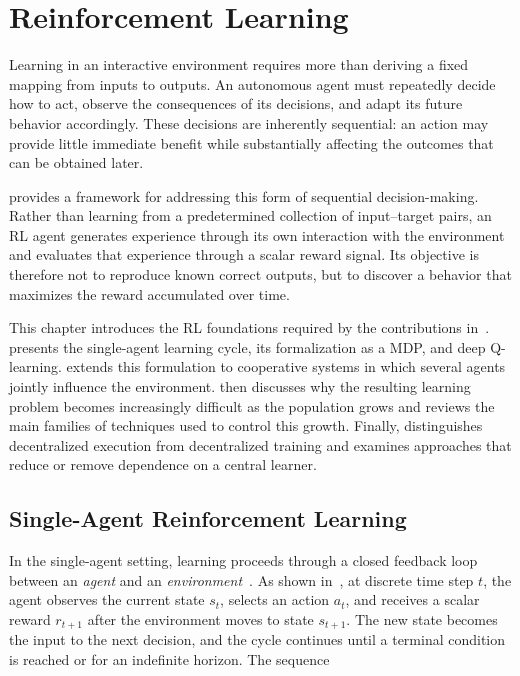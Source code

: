 \chapter{Reinforcement Learning}
\label{chap:reinforcement-learning}
\minitoc

Learning in an interactive environment requires more than 
 deriving a fixed mapping from inputs to outputs. 
% 
An autonomous agent must repeatedly decide how to act, 
 observe the consequences of its decisions, 
 and adapt its future behavior accordingly. 
% 
These decisions are inherently sequential: 
 an action may provide little immediate benefit 
 while substantially affecting the outcomes that can be obtained later.

 provides a framework for addressing this form 
 of sequential decision-making. 
% 
Rather than learning from a predetermined collection of input--target pairs, 
 an \gls{RL} agent generates experience through its own interaction 
 with the environment and evaluates that experience through a scalar reward signal. 
% 
Its objective is therefore not to reproduce known correct outputs, 
 but to discover a behavior that maximizes the reward accumulated over time.

This chapter introduces the \gls{RL} foundations required 
 by the contributions in~.
%
 presents the single-agent learning cycle, its
formalization as a \gls{MDP}, and deep Q-learning.
%
 extends this formulation to cooperative systems in
which several agents jointly influence the environment.
%
 then discusses why the resulting learning problem
becomes increasingly difficult as the population grows and reviews the main
families of techniques used to control this growth.
%
Finally,  distinguishes decentralized execution from
decentralized training and examines approaches that reduce or remove dependence
on a central learner.


\section{Single-Agent Reinforcement Learning}
\label{sec:rl-single-agent}
\label{sec:rl-framework}

In the single-agent setting, 
 learning proceeds through a closed feedback loop
 between an \emph{agent} and an \emph{environment}~\cite{DBLP:books/lib/SuttonB2018}.
%
As shown in~, 
 at discrete time step $t$, the agent observes the current state $s_t$, 
 selects an action $a_t$, and receives a scalar reward $r_{t+1}$ after 
 the environment moves to state $s_{t+1}$.
%
The new state becomes the input to the next decision, 
 and the cycle continues until a terminal condition is reached or for an indefinite horizon.
%
The sequence

